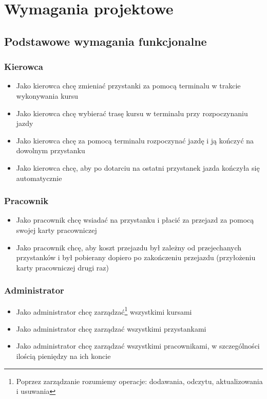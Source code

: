 \section{Wymagania projektowe}
\subsection{Podstawowe wymagania funkcjonalne}
\subsubsection{Kierowca}
\begin{itemize}
  \item{Jako kierowca chcę zmieniać przystanki za pomocą terminalu w trakcie wykonywania kursu}
  \item{Jako kierowca chcę wybierać trasę kursu w terminalu przy rozpoczynaniu jazdy}
  \item{Jako kierowca chcę za pomocą terminalu rozpoczynać jazdę i ją kończyć na dowolnym przystanku}
  \item{Jako kierowca chcę, aby po dotarciu na ostatni przystanek jazda kończyła się automatycznie}
\end{itemize}
\subsubsection{Pracownik}
\begin{itemize}
  \item{Jako pracownik chcę wsiadać na przystanku i płacić za przejazd za pomocą swojej karty pracowniczej}
  \item{Jako pracownik chcę, aby koszt przejazdu był zależny od przejechanych przystanków i był pobierany dopiero po zakończeniu przejazdu (przyłożeniu karty pracowniczej drugi raz)}
\end{itemize}
\subsubsection{Administrator}
\begin{itemize}
  \item{Jako administrator chcę zarządzać\footnote{Poprzez zarządzanie rozumiemy operacje: dodawania, odczytu, aktualizowania i usuwania} wszystkimi kursami}
  \item{Jako administrator chcę zarządzać wszystkimi przystankami}
  \item{Jako administrator chcę zarządzać wszystkimi pracownikami, w szczególności ilością pieniędzy na ich koncie}
\end{itemize}
